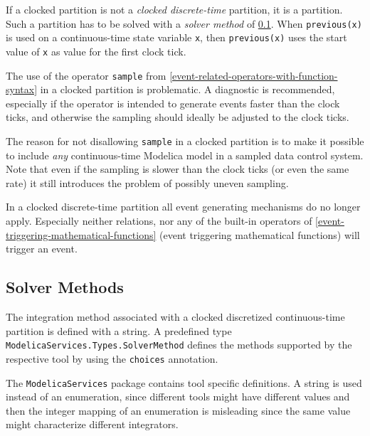 If a clocked partition is not a \emph{clocked discrete-time} partition, it is a  partition.
Such a partition has to be solved with a \emph{solver method} of \cref{solver-methods}.
When \lstinline!previous(x)! is used on a continuous-time state variable \lstinline!x!, then \lstinline!previous(x)! uses the start value of \lstinline!x! as value for the first clock tick.

The use of the operator \lstinline!sample! from \cref{event-related-operators-with-function-syntax} in a clocked partition is problematic.
A diagnostic is recommended, especially if the operator is intended to generate events faster than the clock ticks, and otherwise the sampling should ideally be adjusted to the clock ticks.

\begin{nonnormative}
The reason for not disallowing \lstinline!sample! in a clocked partition is to make it possible to include \emph{any} continuous-time Modelica model in a sampled data control system.
Note that even if the sampling is slower than the clock ticks (or even the same rate) it still introduces the problem of possibly uneven sampling.
\end{nonnormative}

In a clocked discrete-time partition all event generating mechanisms do no longer apply.
Especially neither relations, nor any of the built-in operators of \cref{event-triggering-mathematical-functions} (event triggering mathematical functions) will trigger an event.

\subsection{Solver Methods}\label{solver-methods}

The integration method associated with a clocked discretized continuous-time partition is defined with a string.
A predefined type \lstinline!ModelicaServices.Types.SolverMethod! defines the methods supported by the respective tool by using the \lstinline!choices! annotation.

\begin{nonnormative}
The \lstinline!ModelicaServices! package contains tool specific definitions.  A string is used instead of an enumeration, since different tools might have different values and then the
integer mapping of an enumeration is misleading since the same value might characterize different integrators.
\end{nonnormative}

